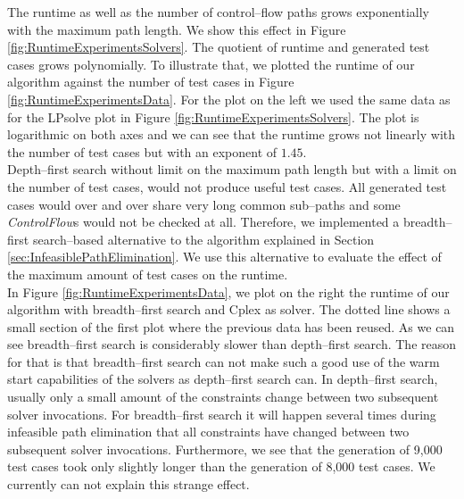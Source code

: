 \documentclass[runningheads,a4paper]{llncs}%
\newcommand{\UMLType}[1]{\textsf{\textit{#1}}} %
\begin{document}
The runtime as well as the number of control--flow paths grows exponentially with the maximum path length. We show this effect in Figure \ref{fig:RuntimeExperimentsSolvers}. The quotient of runtime and generated test cases grows polynomially. 
To illustrate that, we plotted the runtime of our algorithm against the number of test cases in Figure \ref{fig:RuntimeExperimentsData}. For the plot on the left we used the same data as for the LPsolve plot in Figure \ref{fig:RuntimeExperimentsSolvers}. The plot is logarithmic on both axes and we can see that the runtime grows not linearly with the number of test cases but with an exponent of $1.45$.\\
Depth--first search without limit on the maximum path length but with a limit on the number of test cases, would not produce useful test cases. All generated test cases would over and over share very long common sub--paths and some \UMLType{ControlFlow}s would not be checked at all. Therefore, 
we implemented a breadth--first search--based alternative to the algorithm explained in Section \ref{sec:InfeasiblePathElimination}. We use this alternative to evaluate the effect of the maximum amount of test cases on the runtime.\\
In Figure \ref{fig:RuntimeExperimentsData}, we plot on the right the runtime of our algorithm with breadth--first search and Cplex as solver. The dotted line shows a small section of the first plot where the previous data has been reused. As we can see breadth--first search is considerably slower than depth--first search. The reason for that is that breadth--first search can not make such a good use of the warm start capabilities of the solvers as depth--first search can. In depth--first search, usually only a small amount of the constraints change between two subsequent solver invocations. For breadth--first search it will happen several times during infeasible path elimination that all constraints have changed between two subsequent solver invocations. Furthermore, we see that the generation of 9,000 test cases took only slightly longer than the generation of 8,000 test cases. We currently can not explain this strange effect.
\end{document}
